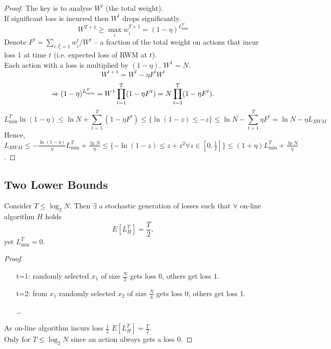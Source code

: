 \begin{proof}
The key is to analyse $W^t$ (the total weight).\\
If significant loss is incurred then $W^t$ drops significantly.\\
$$
W^{T+1}\geqslant\max\limits_i w^{T+1}_i=(1-\eta)^{L^T_{\min}}
$$
Denote $F^t=\sum\limits_{i:l^t_i=1}w^t_i/W^t$ -- a fraction of the total weight on actions that incur loss 1 at time $t$ (i.e. expected loss of RWM at $t$).\\
Each action with a loss is multiplied by $(1-\eta)$. $W^1=N$.
$$
W^{t+1}=W^t-\eta F^tW^t
$$ 
$$
\Rightarrow (1-\eta)^{L^T_{\min}}=W^1\prod\limits_{t=1}^T(1-\eta F^t)=N\prod\limits_{t=1}^T(1-\eta F^t).
$$
$$
L^T_{\min}\ln (1-\eta)\leqslant\ln N+\sum\limits_{t=1}^T(1-\eta F^t)\leqslant\{\ln(1-z)\leqslant-z\}\leqslant\ln N-\sum\limits_{t=1}^T\eta F^t=\ln N-\eta L_{RWM}
$$
Hence, $L_{RWM}\leqslant-\frac{\ln(1-\eta)}{\eta}L^T_{\min}+\frac{\ln N}{\eta}\leqslant\{-\ln(1-z)\leqslant z+z^2\forall z\in[0,\frac{1}{2}]\}\leqslant(1+\eta)L^T_{\min}+\frac{\ln N}{\eta}$.
\end{proof}
\subsection{Two Lower Bounds}
\begin{theorem}
Consider $T\leq\log_2N$. Then $\exists$ a stochastic generation of losses such that $\forall$ on-line algorithm $H$ holds
$$
E\left[L^T_H\right]=\frac{T}{2},
$$
yet $L^T_{\min}=0$.
\end{theorem}
\begin{proof}
\begin{itemize}
\item[t=1:] randomly selected $x_1$ of size $\frac{N}{2}$ gets loss 0, others get loss 1.
\item[t=2:] from $x_1$ randomly selected $x_2$ of size $\frac{N}{4}$ gets loss 0, others get loss 1.
\item[] \ldots
\end{itemize}
As on-line algorithm incurs loss $\frac{1}{2}$ $E\left[L^T_H\right]=\frac{T}{2}$.\\
Only for $T\leq\log_2N$ since an action always gets a loss 0.
\end{proof}
